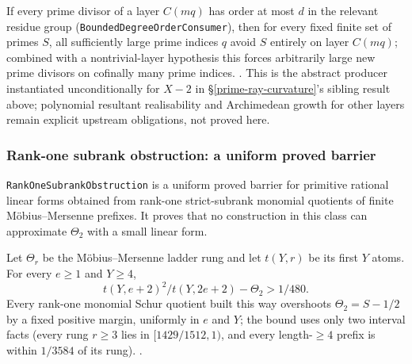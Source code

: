 \begin{thm}
If every prime divisor of a layer $C(mq)$ has order at most $d$ in the
relevant residue group (\texttt{BoundedDegreeOrderConsumer}), then for every
fixed finite set of primes $S$, all sufficiently large prime indices $q$
avoid $S$ entirely on layer $C(mq)$; combined with a nontrivial-layer
hypothesis this forces arbitrarily large new prime divisors on cofinally
many prime indices.
\quad {}
\quad {} \quad {} \quad {}. This
is the abstract producer instantiated unconditionally for $X-2$ in
\S\ref{prime-ray-curvature}'s sibling result above; polynomial resultant
realisability and Archimedean growth for other layers remain explicit
upstream obligations, not proved here.
\end{thm}

\subsubsection{Rank-one subrank obstruction: a uniform proved barrier}
\label{rank-one-subrank}

\texttt{RankOneSubrankObstruction} is a uniform proved barrier for primitive
rational linear forms obtained from rank-one strict-subrank monomial quotients
of finite Möbius--Mersenne prefixes.  It proves that no construction in this
class can approximate \(\Theta_2\) with a small linear form.

\begin{thm}
Let $\Theta_r$ be the Möbius--Mersenne ladder rung and let $t(Y,r)$ be its
first $Y$ atoms. For every $e\ge 1$ and $Y\ge 4$,
$$t(Y,e{+}2)^2/t(Y,2e{+}2) - \Theta_2 > 1/480.$$
Every rank-one monomial Schur quotient built this way overshoots $\Theta_2 =
S-1/2$ by a fixed positive margin, uniformly in $e$ and $Y$; the bound uses
only two interval facts (every rung $r\ge 3$ lies in $[1429/1512,1)$, and
every length-$\ge\!4$ prefix is within $1/3584$ of its rung).
\quad {}
\quad {} \quad {} \quad {}.
\end{thm}

